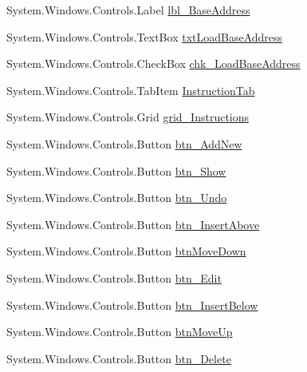 \begin{DoxyCompactItemize}
System.\+Windows.\+Controls.\+Label \hyperlink{class_c_p_u___o_s___simulator_1_1_main_window_ae3adff2ef98d792ce094dcc229c293a8}{lbl\+\_\+\+Base\+Address}
\item 
System.\+Windows.\+Controls.\+Text\+Box \hyperlink{class_c_p_u___o_s___simulator_1_1_main_window_ae6c0ce6078d081b2cb99518c68f1cd85}{txt\+Load\+Base\+Address}
\item 
System.\+Windows.\+Controls.\+Check\+Box \hyperlink{class_c_p_u___o_s___simulator_1_1_main_window_a8ade8cf3e5e2ec2374c984dac406b5e9}{chk\+\_\+\+Load\+Base\+Address}
\item 
System.\+Windows.\+Controls.\+Tab\+Item \hyperlink{class_c_p_u___o_s___simulator_1_1_main_window_a4fe9f6d97eb1f2c45b9e5a0363e61557}{Instruction\+Tab}
\item 
System.\+Windows.\+Controls.\+Grid \hyperlink{class_c_p_u___o_s___simulator_1_1_main_window_af09ff1f305e936227c4a975f4c788133}{grid\+\_\+\+Instructions}
\item 
System.\+Windows.\+Controls.\+Button \hyperlink{class_c_p_u___o_s___simulator_1_1_main_window_a50fb8fcd9e592c4987fac4bcb8762785}{btn\+\_\+\+Add\+New}
\item 
System.\+Windows.\+Controls.\+Button \hyperlink{class_c_p_u___o_s___simulator_1_1_main_window_a3c6c4760a8fd64f653fff0ad06374f13}{btn\+\_\+\+Show}
\item 
System.\+Windows.\+Controls.\+Button \hyperlink{class_c_p_u___o_s___simulator_1_1_main_window_ac30720a1b345a3d59312d2d68f742359}{btn\+\_\+\+Undo}
\item 
System.\+Windows.\+Controls.\+Button \hyperlink{class_c_p_u___o_s___simulator_1_1_main_window_a23c681375b103d2294ac79c51f1fb406}{btn\+\_\+\+Insert\+Above}
\item 
System.\+Windows.\+Controls.\+Button \hyperlink{class_c_p_u___o_s___simulator_1_1_main_window_ac6bfabebf21c92a905764305b789df46}{btn\+Move\+Down}
\item 
System.\+Windows.\+Controls.\+Button \hyperlink{class_c_p_u___o_s___simulator_1_1_main_window_ae07013ea273fb1e9f38fd1dd83144371}{btn\+\_\+\+Edit}
\item 
System.\+Windows.\+Controls.\+Button \hyperlink{class_c_p_u___o_s___simulator_1_1_main_window_a7c6c417d0bd3af11e77f86cf2cfb03fe}{btn\+\_\+\+Insert\+Below}
\item 
System.\+Windows.\+Controls.\+Button \hyperlink{class_c_p_u___o_s___simulator_1_1_main_window_aa85d9301fed773f44a352aad64a9d80d}{btn\+Move\+Up}
\item 
System.\+Windows.\+Controls.\+Button \hyperlink{class_c_p_u___o_s___simulator_1_1_main_window_a74623b1e8f8ab1b3b6835bda2e8a9256}{btn\+\_\+\+Delete}

\end{DoxyCompactItemize}
